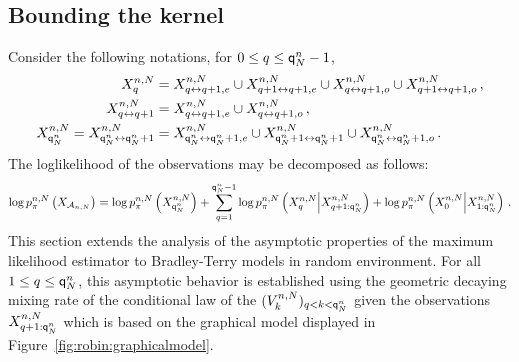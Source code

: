 \subsection{Bounding the kernel}
Consider the following notations, for $0\le q \le {\mathsf{q}}^{n}_{N}-1$,
\begin{align*}
X_{q}^{n,N}                   & = X_{q \leftrightarrow q+1,e}^{n,N}\cup X_{q+1\leftrightarrow q+1,e}^{n,N}\cup X_{q\leftrightarrow q+1,o}^{n,N}\cup X_{q+1 \leftrightarrow q+1,o}^{n,N}\,,\\
X^{n,N}_{q\leftrightarrow q+1} &= X^{n,N}_{q\leftrightarrow q+1,e}\cup X^{n,N}_{q\leftrightarrow q+1,o}\,,\\
X_{{\mathsf{q}}^{n}_{N}}^{n,N} = X_{{\mathsf{q}}^{n}_{N}\leftrightarrow{\mathsf{q}}^{n}_{N}+1}^{n,N} & = X_{{\mathsf{q}}^{n}_{N} \leftrightarrow {\mathsf{q}}^{n}_{N} +1,e}^{n,N}\cup X_{{\mathsf{q}}^{n}_{N}+1\leftrightarrow{\mathsf{q}}^{n}_{N}+1}^{n,N}\cup X_{{\mathsf{q}}^{n}_{N}\leftrightarrow{\mathsf{q}}^{n}_{N}+1,o}^{n,N}\,.
\end{align*}
The loglikelihood of the observations may be decomposed as follows:
\[
\log p_{\pi}^{n,N}\left(X_{\mathcal{A}_{n,N}}\right) = \log p_{\pi}^{n,N}\left(X_{{\mathsf{q}}^{n}_{N}}^{n,N}\right) + \sum_{q=1}^{{\mathsf{q}}^{n}_{N}-1}  \log p_{\pi}^{n,N}\left(X_{q}^{n,N}\middle|X_{q+1:{\mathsf{q}}^{n}_{N}}^{n,N}\right) +  \log p_{\pi}^{n,N}\left(X_{0}^{n,N}\middle|X_{1:{\mathsf{q}}^{n}_{N}}^{n,N}\right)\,.
\]
This section extends the analysis of the asymptotic properties of the maximum likelihood estimator to Bradley-Terry models in random environment. For all $1\le q \le {\mathsf{q}}^{n}_{N}$, this asymptotic behavior is established using the geometric decaying mixing rate of the conditional law of the $(V^{n,N}_{k})_{q< k < {\mathsf{q}}^{n}_{N}}$ given the observations $X^{n,N}_{q+1:{\mathsf{q}}^{n}_{N}}$ which is based on the graphical model displayed in Figure~\ref{fig:robin:graphicalmodel}.
